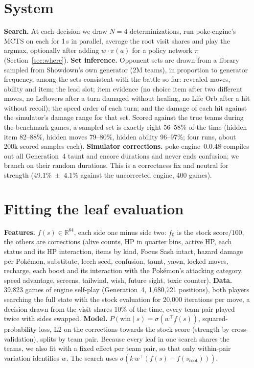 \documentclass[conference]{IEEEtran}
\begin{document}
\section{System}
\textbf{Search.} At each decision we draw $N{=}4$ determinizations, run poke-engine's MCTS on each for 1\,s in
parallel, average the root visit shares and play the argmax, optionally after adding $w\cdot\pi(a)$ for a policy
network $\pi$ (Section~\ref{sec:where}).
\textbf{Set inference.} Opponent sets are drawn from a library sampled from Showdown's own generator (2M teams),
in proportion to generator frequency, among the sets consistent with the battle so far: revealed moves, ability and
item; the lead slot; item evidence (no choice item after two different moves, no Leftovers after a turn damaged
without healing, no Life Orb after a hit without recoil); the speed order of each turn; and the damage of each hit
against the simulator's damage range for that set. Scored against the true teams during the benchmark games, a
sampled set is exactly right 56--58\% of the time (hidden item 82--88\%, hidden moves 79--80\%, hidden ability
96--97\%; four runs, about 200k scored samples each).
\textbf{Simulator corrections.} poke-engine~0.0.48 compiles out all Generation~4 taunt and encore durations and
never ends confusion; we branch on their random durations. This is a correctness fix and neutral for strength
(49.1\%~$\pm$~4.1\% against the uncorrected engine, 400 games).

\section{Fitting the leaf evaluation}\label{sec:fit}
\textbf{Features.} $f(s)\in\mathbb{R}^{64}$, each side one minus side two: $f_0$ is the stock score$/100$, the
others are corrections (alive counts, HP in quarter bins, active HP, each status and its HP interaction, items by
kind, Focus Sash intact, hazard damage per Pok\'emon, substitute, leech seed, confusion, taunt, yawn, locked moves,
recharge, each boost and its interaction with the Pok\'emon's attacking category, speed advantage, screens,
tailwind, wish, future sight, toxic counter).
\textbf{Data.} 39{,}823 games of engine self-play (Generation~4, 1{,}680{,}721 positions), both players searching
the full state with the stock evaluation for 20{,}000 iterations per move, a decision drawn from the visit shares
10\% of the time, every team pair played twice with sides swapped.
\textbf{Model.} $P(\text{win}\mid s)=\sigma(w^\top f(s))$, squared-probability loss, L2 on the corrections towards
the stock score (strength by cross-validation), splits by team pair. Because every leaf in one search shares the
teams, we also fit with a fixed effect per team pair, so that only within-pair variation identifies $w$.
The search uses $\sigma(k\,w^\top(f(s)-f(s_{\text{root}})))$.
\end{document}
